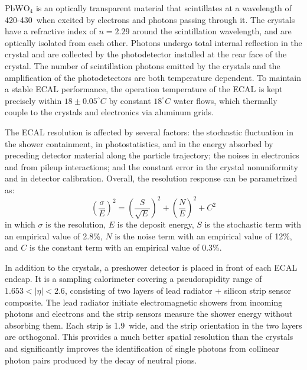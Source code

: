 $\text{PbWO}_{4}$ is an optically transparent material that scintillates at a wavelength of 420-430~\nm when excited by electrons and photons passing through it.
The crystals have a refractive index of $n = 2.29$ around the scintillation wavelength, and are optically isolated from each other.
Photons undergo total internal reflection in the crystal and are collected by the photodetector installed at the rear face of the crystal.  
The number of scintillation photons emitted by the crystals and the amplification of the photodetectors are both temperature dependent.
To maintain a stable ECAL performance, the operation temperature of the ECAL is kept precisely within $18 \pm 0.05^{\circ}C$
by constant $18^{\circ}C$ water flows, which thermally couple to the crystals and electronics via aluminum grids.

The ECAL resolution is affected by several factors: 
the stochastic fluctuation in the shower containment, in photostatistics, and in the energy absorbed by preceding detector material along the particle trajectory; 
the noises in electronics and from pileup interactions;
and the constant error in the crystal nonuniformity and in detector calibration.
Overall, the resolution response can be parametrized as:
\begin{equation}\label{eq:ecal_reso}
    ( \frac{\sigma}{E} )^{2} = ( \frac{S}{\sqrt{E}} )^{2} + ( \frac{N}{E} )^{2} + C^{2}
\end{equation}
in which $\sigma$ is the resolution, $E$ is the deposit energy,
$S$ is the stochastic term with an empirical value of 2.8\%, 
$N$ is the noise term with an empirical value of 12\%,
and $C$ is the constant term with an empirical value of 0.3\%.

In addition to the crystals, a preshower detector is placed in front of each ECAL endcap. 
It is a sampling calorimeter covering a pseudorapidity range of $1.653 < |\eta| < 2.6$, 
consisting of two layers of lead radiator + silicon strip sensor composite. 
The lead radiator initiate electromagnetic showers from incoming photons and electrons and the strip sensors measure the shower energy without absorbing them.
Each strip is 1.9~\mm wide, and the strip orientation in the two layers are orthogonal.
This provides a much better spatial resolution than the crystals and significantly improves the 
identification of single photons from collinear photon pairs produced by the decay of neutral pions.


